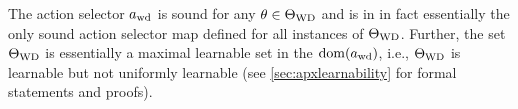 The action selector $a_{\mathrm{wd}}$ is sound for any $\theta \in \Theta_{\mathrm{WD}}$ and is in in fact essentially the only sound action selector map defined for all instances %
of $\Theta_{\mathrm{WD}}$. Further, the set $\Theta_{\mathrm{WD}}$ is essentially a maximal learnable set in the  $\mathrm{dom}(a_{\mathrm{wd}})$, i.e., $\Theta_{\mathrm{WD}}$ is learnable but not uniformly learnable
 (see \cref{sec:apxlearnability} for formal statements and proofs).

